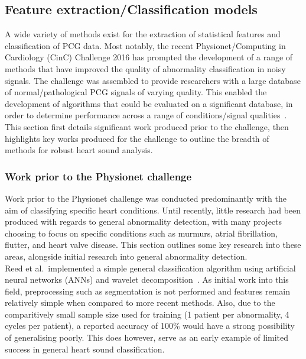 \documentclass[titlepage, 12pt]{scrartcl} \usepackage{enumitem}
\begin{document}
\doublespacing

\subsection{Feature extraction/Classification models}\label{Classification}

A wide variety of methods exist for the extraction of statistical features and
classification of PCG data. Most notably, the recent Physionet/Computing in
Cardiology (CinC) Challenge 2016 has prompted the development of a range of
methods that have improved the quality of abnormality classification in noisy
signals.  The challenge was assembled to provide researchers with a large
database of normal/pathological PCG signals of varying quality. This enabled
the development of algorithms that could be evaluated on a significant
database, in order to determine performance across a range of conditions/signal
qualities~\parencite{Clifford2016}. This section first details significant work
produced prior to the challenge, then highlights key works produced for the
challenge to outline the breadth of methods for robust heart sound analysis.

\subsubsection{Work prior to the Physionet challenge}
Work prior to the Physionet challenge was conducted predominantly with the aim
of classifying specific heart conditions. Until recently, little research had
been produced with regards to general abnormality detection, with many projects
choosing to focus on specific conditions such as murmurs, atrial fibrillation,
flutter, and heart valve disease. This section outlines some key research
into these areas, alongside initial research into general abnormality
detection.\\

Reed et al.\ implemented a simple general classification algorithm using
artificial neural networks (ANNs) and wavelet
decomposition~\parencite{Reed2004}. As initial work into this field,
preprocessing such as segmentation is not performed and features remain
relatively simple when compared to more recent methods. Also, due to the
comparitively small sample size used for training (1 patient per abnormality, 4
cycles per patient), a reported accuracy of 100\% would have a strong
possibility of generalising poorly. This does however, serve as an early
example of limited success in general heart sound classification.\\
\end{document}
